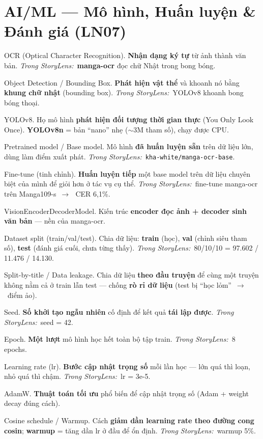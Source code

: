 \documentclass[11pt]{article}
\newcommand{\arr}{\,\ensuremath{\rightarrow}\,}
\newcommand{\code}[1]{\texttt{\small #1}}
\newcommand{\insl}{\textit{\textcolor{steel}{Trong StoryLens:}}\ }
\begin{document}
\section{AI/ML --- Mô hình, Huấn luyện \& Đánh giá (LN07)}
\begin{terms}
\item[OCR (Optical Character Recognition).] \textbf{Nhận dạng ký tự} từ ảnh thành văn bản. \insl \textbf{manga-ocr} đọc chữ Nhật trong bong bóng.
\item[Object Detection / Bounding Box.] \textbf{Phát hiện vật thể} và khoanh nó bằng \textbf{khung chữ nhật} (bounding box). \insl YOLOv8 khoanh bong bóng thoại.
\item[YOLOv8.] Họ mô hình \textbf{phát hiện đối tượng thời gian thực} (You Only Look Once). \textbf{YOLOv8n} = bản ``nano'' nhẹ ($\sim$3M tham số), chạy được CPU.
\item[Pretrained model / Base model.] Mô hình \textbf{đã huấn luyện sẵn} trên dữ liệu lớn, dùng làm điểm xuất phát. \insl \code{kha-white/manga-ocr-base}.
\item[Fine-tune (tinh chỉnh).] \textbf{Huấn luyện tiếp} một base model trên dữ liệu chuyên biệt của mình để giỏi hơn ở tác vụ cụ thể. \insl fine-tune manga-ocr trên Manga109-s \arr\ CER 6,1\%.
\item[VisionEncoderDecoderModel.] Kiến trúc \textbf{encoder đọc ảnh + decoder sinh văn bản} --- nền của manga-ocr.
\item[Dataset split (train/val/test).] Chia dữ liệu: \textbf{train} (học), \textbf{val} (chỉnh siêu tham số), \textbf{test} (đánh giá cuối, chưa từng thấy). \insl 80/10/10 = 97.602 / 11.476 / 14.130.
\item[Split-by-title / Data leakage.] Chia dữ liệu \textbf{theo đầu truyện} để cùng một truyện không nằm cả ở train lẫn test --- chống \textbf{rò rỉ dữ liệu} (test bị ``học lỏm'' \arr\ điểm ảo).
\item[Seed.] \textbf{Số khởi tạo ngẫu nhiên} cố định để kết quả \textbf{tái lập được}. \insl seed = 42.
\item[Epoch.] \textbf{Một lượt} mô hình học hết toàn bộ tập train. \insl 8 epochs.
\item[Learning rate (lr).] \textbf{Bước cập nhật trọng số} mỗi lần học --- lớn quá thì loạn, nhỏ quá thì chậm. \insl lr = 3e-5.
\item[AdamW.] \textbf{Thuật toán tối ưu} phổ biến để cập nhật trọng số (Adam + weight decay đúng cách).
\item[Cosine schedule / Warmup.] Cách \textbf{giảm dần learning rate theo đường cong cosin}; \textbf{warmup} = tăng dần lr ở đầu để ổn định. \insl warmup 5\%.

\end{terms}
\end{document}
